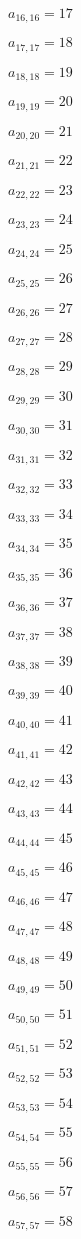 \documentclass[a4paper,12pt]{article}
\begin{document}
$a _{ 16, 16 } = 17$

$a _{ 17, 17 } = 18$

$a _{ 18, 18 } = 19$

$a _{ 19, 19 } = 20$

$a _{ 20, 20 } = 21$

$a _{ 21, 21 } = 22$

$a _{ 22, 22 } = 23$

$a _{ 23, 23 } = 24$

$a _{ 24, 24 } = 25$

$a _{ 25, 25 } = 26$

$a _{ 26, 26 } = 27$

$a _{ 27, 27 } = 28$

$a _{ 28, 28 } = 29$

$a _{ 29, 29 } = 30$

$a _{ 30, 30 } = 31$

$a _{ 31, 31 } = 32$

$a _{ 32, 32 } = 33$

$a _{ 33, 33 } = 34$

$a _{ 34, 34 } = 35$

$a _{ 35, 35 } = 36$

$a _{ 36, 36 } = 37$

$a _{ 37, 37 } = 38$

$a _{ 38, 38 } = 39$

$a _{ 39, 39 } = 40$

$a _{ 40, 40 } = 41$

$a _{ 41, 41 } = 42$

$a _{ 42, 42 } = 43$

$a _{ 43, 43 } = 44$

$a _{ 44, 44 } = 45$

$a _{ 45, 45 } = 46$

$a _{ 46, 46 } = 47$

$a _{ 47, 47 } = 48$

$a _{ 48, 48 } = 49$

$a _{ 49, 49 } = 50$

$a _{ 50, 50 } = 51$

$a _{ 51, 51 } = 52$

$a _{ 52, 52 } = 53$

$a _{ 53, 53 } = 54$

$a _{ 54, 54 } = 55$

$a _{ 55, 55 } = 56$

$a _{ 56, 56 } = 57$

$a _{ 57, 57 } = 58$
\end{document}
